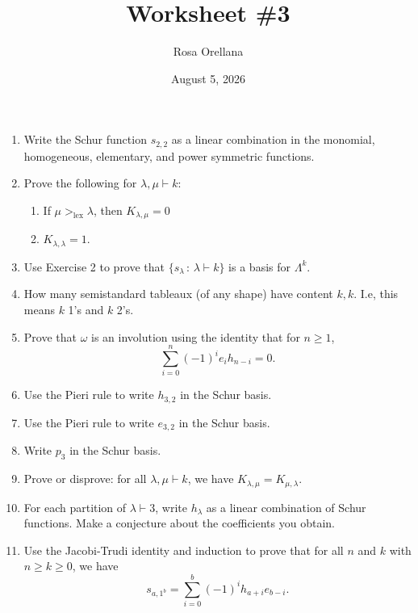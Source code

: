\documentclass{article}
\title{Worksheet \#3}
\author{Rosa Orellana}
\date{August 5, 2026}
\begin{document}
\maketitle
\begin{enumerate}
\item Write the Schur function $s_{2,2}$ as a linear combination in the monomial, homogeneous, elementary, and power symmetric functions. 

\item Prove the following for $\lambda,\mu \vdash k$: 
\begin{enumerate}
\item If $\mu>_{\text{lex}} \lambda$, then $K_{\lambda, \mu} =0$
\item $K_{\lambda,\lambda} = 1$.
\end{enumerate}
\item Use Exercise 2 to prove that $\{s_\lambda\, : \, \lambda\vdash k\}$ is a basis for $\Lambda^k$. 

\item How many semistandard tableaux (of any shape) have content $k,k$. I.e, this means $k$ 1's and $k$ 2's.

\item Prove that $\omega$ is an involution using the identity that for $n\geq 1$, \[\sum_{i=0}^n(-1)^i e_ih_{n-i} =0.\] 

\item Use the Pieri rule to write $h_{3,2}$ in the Schur basis. 

\item Use the Pieri rule to write $e_{3,2}$ in the Schur basis. 

\item Write $p_3$ in the Schur basis. 

\item Prove or disprove: for all $\lambda, \mu\vdash k$, we have $K_{\lambda, \mu}=K_{\mu, \lambda}$.

\item For each partition of $\lambda \vdash 3$, write $h_\lambda$ as a linear combination of Schur functions. Make a conjecture about the coefficients you obtain. 

\item Use the Jacobi-Trudi identity and induction to prove that for all $n$ and $k$ with $n \geq k\geq 0$, we have 
\[ 
s_{a,1^b} = \sum_{i=0}^b (-1)^{i} h_{a+i} e_{b-i}.
\]
\end{enumerate}
\end{document}
